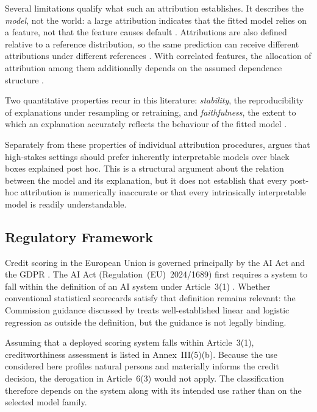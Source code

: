 Several limitations qualify what such an attribution establishes. It describes the
\emph{model}, not the world: a large attribution indicates that the fitted model relies
on a feature, not that the feature causes default
\citep{rudinStopExplainingBlack2019a,
liptonMythosModelInterpretability2018}. Attributions are also defined relative to a
reference distribution, so the same prediction can receive different attributions
under different references
\citep{nautaAnecdotalEvidenceQuantitative2023}. With correlated features, the
allocation of attribution among them additionally depends on the assumed dependence
structure \citep{aasExplainingIndividualPredictions2021}.

Two quantitative properties recur in this literature: \emph{stability}, the
reproducibility of explanations under resampling or retraining, and
\emph{faithfulness}, the extent to which an explanation accurately reflects the
behaviour of the fitted model
\citep{nautaAnecdotalEvidenceQuantitative2023}.

Separately from these properties of individual attribution procedures,
\citet{rudinStopExplainingBlack2019a} argues that high-stakes settings should prefer
inherently interpretable models over black boxes explained post hoc. This is a
structural argument about the relation between the model and its explanation, but it does
not establish that every post-hoc attribution is numerically inaccurate or that every
intrinsically interpretable model is readily understandable.

\subsection{Regulatory Framework}\label{sec:regulatory}

Credit scoring in the European Union is governed principally by the AI Act and the
GDPR \citep{mullerAIbasedCreditScoring2025}. The AI Act
(Regulation~(EU)~2024/1689) first requires a system to fall within the definition of
an AI system under Article~3(1) \citep{EUAIAct2024}. Whether conventional statistical
scorecards satisfy that definition remains relevant: the Commission guidance
discussed by \citet{mullerAIbasedCreditScoring2025} treats well-established linear and
logistic regression as outside the definition, but the guidance is not legally
binding.

Assuming that a deployed scoring system falls within Article~3(1),
creditworthiness assessment is listed in Annex~III(5)(b). Because the use considered
here profiles natural persons and materially informs the credit decision, the
derogation in Article~6(3) would not apply. The classification therefore depends on
the system along with its intended use rather than on the selected model family.

